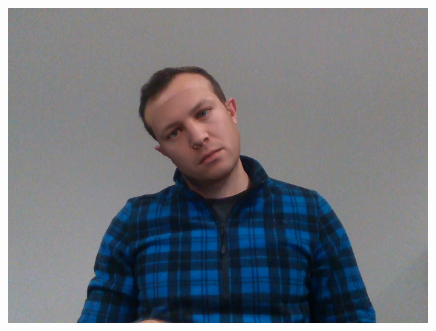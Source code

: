 \begin{figure}[h]
\begin{minipage}{.325\textwidth}
      \includegraphics[width=0.99\textwidth]{Figures/dataset/blended/6.png}
    \end{minipage}


\end{figure}

